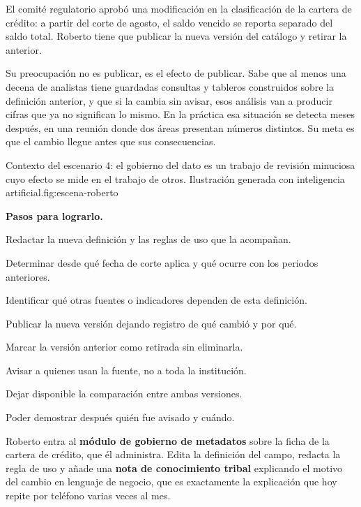 
El comité regulatorio aprobó una modificación en la clasificación de la cartera de crédito: a
partir del corte de agosto, el saldo vencido se reporta separado del saldo total. Roberto tiene
que publicar la nueva versión del catálogo y retirar la anterior.

Su preocupación no es publicar, es el efecto de publicar. Sabe que al menos una decena de
analistas tiene guardadas consultas y tableros construidos sobre la definición anterior, y que
si la cambia sin avisar, esos análisis van a producir cifras que ya no significan lo mismo. En
la práctica esa situación se detecta meses después, en una reunión donde dos áreas presentan
números distintos. Su meta es que el cambio llegue antes que sus consecuencias.

  {Contexto del escenario 4: el gobierno del dato es un trabajo de revisión minuciosa cuyo
   efecto se mide en el trabajo de otros. Ilustración generada con inteligencia
   artificial.}{fig:escena-roberto}

\textbf{\textcolor{uxnavy}{Pasos para lograrlo.}}

\begin{uxpreg}
\item Redactar la nueva definición y las reglas de uso que la acompañan.
\item Determinar desde qué fecha de corte aplica y qué ocurre con los periodos anteriores.
\item Identificar qué otras fuentes o indicadores dependen de esta definición.
\item Publicar la nueva versión dejando registro de qué cambió y por qué.
\item Marcar la versión anterior como retirada sin eliminarla.
\item Avisar a quienes usan la fuente, no a toda la institución.
\item Dejar disponible la comparación entre ambas versiones.
\item Poder demostrar después quién fue avisado y cuándo.
\end{uxpreg}


Roberto entra al \textbf{módulo de gobierno de metadatos} sobre la ficha de la cartera de
crédito, que él administra. Edita la definición del campo, redacta la regla de uso y añade una
\textbf{nota de conocimiento tribal} explicando el motivo del cambio en lenguaje de negocio,
que es exactamente la explicación que hoy repite por teléfono varias veces al mes.

